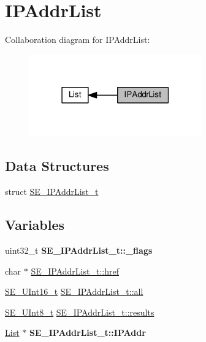\hypertarget{group__IPAddrList}{}\section{I\+P\+Addr\+List}
\label{group__IPAddrList}
Collaboration diagram for I\+P\+Addr\+List\+:\nopagebreak
\begin{figure}[H]
\begin{center}
\leavevmode
\includegraphics[width=210pt]{group__IPAddrList}
\end{center}
\end{figure}
\subsection*{Data Structures}
\begin{DoxyCompactItemize}
\item 
struct \hyperlink{structSE__IPAddrList__t}{S\+E\+\_\+\+I\+P\+Addr\+List\+\_\+t}
\end{DoxyCompactItemize}
\subsection*{Variables}
\begin{DoxyCompactItemize}
\item 
\mbox{\label{group__IPAddrList_ga4991ba82a619016f74f97b0cabc6a6a6}} 
uint32\+\_\+t {\bfseries S\+E\+\_\+\+I\+P\+Addr\+List\+\_\+t\+::\+\_\+flags}
\item 
char $\ast$ \hyperlink{group__IPAddrList_ga4c7cdf66f95fb3279369ecfe722484ac}{S\+E\+\_\+\+I\+P\+Addr\+List\+\_\+t\+::href}
\item 
\hyperlink{group__UInt16_gac68d541f189538bfd30cfaa712d20d29}{S\+E\+\_\+\+U\+Int16\+\_\+t} \hyperlink{group__IPAddrList_gae540628e2b65249a48eac12cfc45ee6e}{S\+E\+\_\+\+I\+P\+Addr\+List\+\_\+t\+::all}
\item 
\hyperlink{group__UInt8_gaf7c365a1acfe204e3a67c16ed44572f5}{S\+E\+\_\+\+U\+Int8\+\_\+t} \hyperlink{group__IPAddrList_ga494d254730f745fc2e82ea322a4fd81f}{S\+E\+\_\+\+I\+P\+Addr\+List\+\_\+t\+::results}
\item 
\mbox{\label{group__IPAddrList_ga800302f7ba718410f1400ae12254107c}} 
\hyperlink{structList}{List} $\ast$ {\bfseries S\+E\+\_\+\+I\+P\+Addr\+List\+\_\+t\+::\+I\+P\+Addr}
\end{DoxyCompactItemize}


